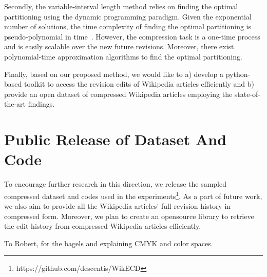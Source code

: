 \documentclass[acmsmall]{acmart}
\begin{document}
Secondly, the variable-interval length method relies on finding the optimal partitioning using the dynamic programming paradigm. Given the exponential number of solutions, the time complexity of finding the optimal partitioning is pseudo-polynomial in time~\cite{enwiki:1014657879}. However, the compression task is a one-time process and is easily scalable over the new future revisions. Moreover, there exist polynomial-time approximation algorithms to find the optimal partitioning.
   
Finally, based on our proposed method, we would like to a) develop a python-based toolkit to access the revision edits of Wikipedia articles efficiently and b) provide an open dataset of compressed Wikipedia articles employing the state-of-the-art findings.

\section{Public Release of Dataset And Code}
To encourage further research in this direction, we release the sampled compressed dataset and codes used in the experiments\footnote{https://github.com/descentis/WikECD}. As a part of future work, we also aim to provide all the Wikipedia articles' full revision history in compressed form. Moreover, we plan to create an opensource library to retrieve the edit history from compressed Wikipedia articles efficiently.   


\begin{acks}
To Robert, for the bagels and explaining CMYK and color spaces.
\end{acks}





\end{document}
